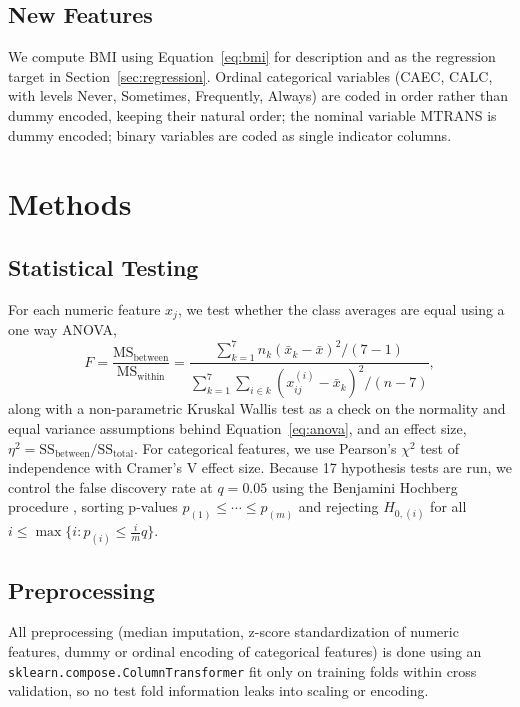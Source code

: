 \documentclass[journal]{IEEEtran}
\begin{document}
\subsection{New Features}
We compute BMI using Equation~\eqref{eq:bmi} for description and as the regression target in Section~\ref{sec:regression}. Ordinal categorical variables (CAEC, CALC, with levels Never, Sometimes, Frequently, Always) are coded in order rather than dummy encoded, keeping their natural order; the nominal variable MTRANS is dummy encoded; binary variables are coded as single indicator columns.

\section{Methods}
\label{sec:methods}

\subsection{Statistical Testing}
For each numeric feature $x_j$, we test whether the class averages are equal using a one way ANOVA,
\begin{equation}
F = \frac{\mathrm{MS}_{\text{between}}}{\mathrm{MS}_{\text{within}}} = \frac{\sum_{k=1}^{7} n_k (\bar{x}_k - \bar{x})^2 / (7-1)}{\sum_{k=1}^{7}\sum_{i \in k} (x_{ij}^{(i)} - \bar{x}_k)^2 / (n-7)},
\label{eq:anova}
\end{equation}
along with a non-parametric Kruskal Wallis test as a check on the normality and equal variance assumptions behind Equation~\eqref{eq:anova}, and an effect size, $\eta^2 = \mathrm{SS}_{\text{between}}/\mathrm{SS}_{\text{total}}$. For categorical features, we use Pearson's $\chi^2$ test of independence with Cramer's V effect size. Because 17 hypothesis tests are run, we control the false discovery rate at $q=0.05$ using the Benjamini Hochberg procedure \cite{benjaminihochberg1995}, sorting p-values $p_{(1)} \le \cdots \le p_{(m)}$ and rejecting $H_{0,(i)}$ for all $i \le \max\{i : p_{(i)} \le \frac{i}{m}q\}$.

\subsection{Preprocessing}
All preprocessing (median imputation, z-score standardization of numeric features, dummy or ordinal encoding of categorical features) is done using an \texttt{sklearn.compose.ColumnTransformer} fit only on training folds within cross validation, so no test fold information leaks into scaling or encoding.
\end{document}
